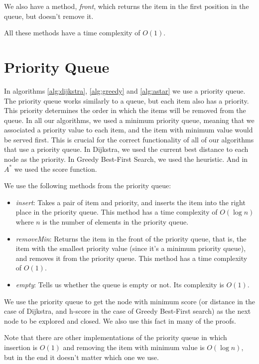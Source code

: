 \documentclass[12pt]{report}
\begin{document}
\begin{appendices}
We also have a method, \emph{front}, which returns the item in the first position in the queue, but doesn't remove it.

All these methods have a time complexity of $O(1)$.

\section{Priority Queue}
In algorithms \ref{alg:dijkstra}, \ref{alg:greedy} and \ref{alg:astar} we use a priority queue. The priority queue works similarly to a queue, but each item also has a priority. This priority determines the order in which the items will be removed from the queue. In all our algorithms, we used a minimum priority queue, meaning that we associated a priority value to each item, and the item with minimum value would be served first. This is crucial for the correct functionality of all of our algorithms that use a priority queue. In Dijkstra, we used the current best distance to each node as the priority. In Greedy Best-First Search, we used the heuristic. And in $A^*$ we used the score function.

We use the following methods from the priority queue:
\begin{itemize}
\item \emph{insert}: Takes a pair of item and priority, and inserts the item into the right place in the priority queue. This method has a time complexity of $O(\log n)$ where $n$ is the number of elements in the priority queue.
\item \emph{removeMin}: Returns the item in the front of the priority queue, that is, the item with the smallest priority value (since it's a minimum priority queue), and removes it from the priority queue. This method has a time complexity of $O(1)$.
\item \emph{empty}: Tells us whether the queue is empty or not. Its complexity is $O(1)$.
\end{itemize}

We use the priority queue to get the node with minimum score (or distance in the case of Dijkstra, and h-score in the case of Greedy Best-First search) as the next node to be explored and closed. We also use this fact in many of the proofs.

Note that there are other implementations of the priority queue in which insertion is $O(1)$ and removing the item with minimum value is $O(\log n)$, but in the end it doesn't matter which one we use.


\end{appendices}
\end{document}
